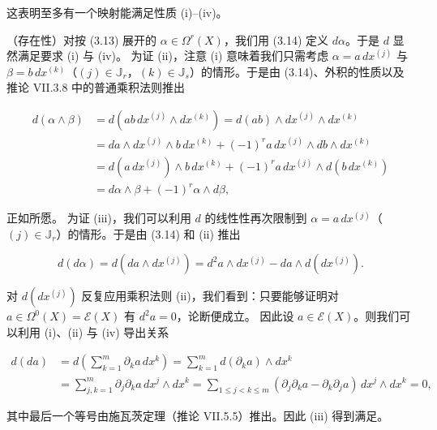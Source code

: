 \begin{theorem}
\begin{items}
这表明至多有一个映射能满足性质 (i)–(iv)。

\item

（存在性）对按 (3.13) 展开的 $ \alpha \in \Omega^{r}(X) $，我们用 (3.14) 定义 $ d\alpha $。于是 $ d $ 显然满足要求 (i) 与 (iv)。
为证 (ii)，注意 (i) 意味着我们只需考虑 $ \alpha = a\,dx^{(j)} $ 与 $ \beta = b\,dx^{(k)} $（$ (j) \in \mathbb{J}_{r} $，$ (k) \in \mathbb{J}_{s} $）的情形。于是由 (3.14)、外积的性质以及推论 VII.3.8 中的普通乘积法则推出

\begin{equation*}
\begin{aligned}
d(\alpha \wedge \beta) &= d(ab\,dx^{(j)} \wedge dx^{(k)}) = d(ab) \wedge dx^{(j)} \wedge dx^{(k)} \\ &= da \wedge dx^{(j)} \wedge b\,dx^{(k)} + (-1)^{r}a\,dx^{(j)} \wedge db \wedge dx^{(k)} \\ &= d(a\,dx^{(j)}) \wedge b\,dx^{(k)} + (-1)^{r}a\,dx^{(j)} \wedge d(b\,dx^{(k)}) \\ &= d\alpha \wedge \beta + (-1)^{r}\alpha \wedge d\beta,
\end{aligned}
\end{equation*}

正如所愿。
为证 (iii)，我们可以利用 $ d $ 的线性性再次限制到 $ \alpha = a\,dx^{(j)} $（$ (j) \in \mathbb{J}_{r} $）的情形。于是由 (3.14) 和 (ii) 推出

\[
d(d\alpha) = d(da \wedge dx^{(j)}) = d^{2}a \wedge dx^{(j)} - da \wedge d(dx^{(j)}).
\]

对 $ d(dx^{(j)}) $ 反复应用乘积法则 (ii)，我们看到：只要能够证明对 $ a \in \Omega^{0}(X) = \mathcal{E}(X) $ 有 $ d^{2}a = 0 $，论断便成立。
因此设 $ a \in \mathcal{E}(X) $。则我们可以利用 (i)、(ii) 与 (iv) 导出关系

\begin{equation*}
\begin{aligned}
d(da) &= d\left(\sum_{k=1}^{m} \partial_{k}a\,dx^{k}\right) = \sum_{k=1}^{m} d(\partial_{k}a) \wedge dx^{k} \\ &= \sum_{j,k=1}^{m} \partial_{j}\partial_{k}a\,dx^{j} \wedge dx^{k} = \sum_{1 \le j < k \le m} (\partial_{j}\partial_{k}a - \partial_{k}\partial_{j}a)\,dx^{j} \wedge dx^{k} = 0,
\end{aligned}
\end{equation*}

其中最后一个等号由施瓦茨定理（推论 VII.5.5）推出。因此 (iii) 得到满足。

\item


\end{items}
\end{theorem}
